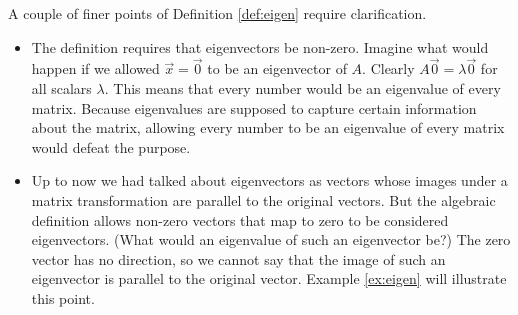 \documentclass{ximera}
\begin{document}
\begin{observation}\label{obs:finerPointsOfEigDef}
A couple of finer points of Definition \ref{def:eigen} require clarification.
  \begin{itemize}
  \item The definition requires that eigenvectors be non-zero.  Imagine what would happen if we allowed $\vec{x}=\vec{0}$ to be an eigenvector of $A$. Clearly $A\vec{0}=\lambda\vec{0}$ for all scalars $\lambda$.  This means that every number would be an eigenvalue of every matrix.  Because eigenvalues are supposed to capture certain information about the matrix, allowing every number to be an eigenvalue of every matrix would defeat the purpose.
  \item Up to now we had talked about  eigenvectors as vectors whose images under a matrix transformation are parallel to the original vectors.  But the algebraic definition allows non-zero vectors that map to zero to be considered eigenvectors.  (What would an eigenvalue of such an eigenvector be?)  The zero vector has no direction, so we cannot say that the image of such an eigenvector is parallel to the original vector.  Example \ref{ex:eigen} will illustrate this point.
  \end{itemize}
\end{observation}
\end{document}
